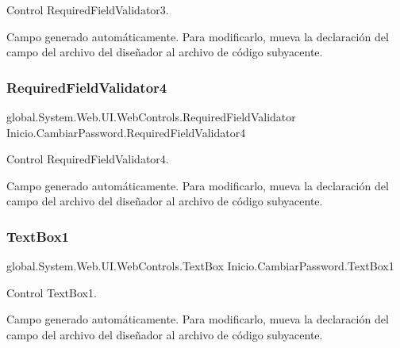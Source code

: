 Control Required\+Field\+Validator3. 

Campo generado automáticamente. Para modificarlo, mueva la declaración del campo del archivo del diseñador al archivo de código subyacente. \mbox{\label{classInicio_1_1CambiarPassword_a721210b960d80ff7c87c392dc8f4d78a}} 
\subsubsection{\texorpdfstring{RequiredFieldValidator4}{RequiredFieldValidator4}}
{\footnotesize\ttfamily global.\+System.\+Web.\+U\+I.\+Web\+Controls.\+Required\+Field\+Validator Inicio.\+Cambiar\+Password.\+Required\+Field\+Validator4\hspace{0.3cm}{\ttfamily [protected]}}



Control Required\+Field\+Validator4. 

Campo generado automáticamente. Para modificarlo, mueva la declaración del campo del archivo del diseñador al archivo de código subyacente. \mbox{\label{classInicio_1_1CambiarPassword_ab827a758058e29a7846579183e4cbcea}} 
\subsubsection{\texorpdfstring{TextBox1}{TextBox1}}
{\footnotesize\ttfamily global.\+System.\+Web.\+U\+I.\+Web\+Controls.\+Text\+Box Inicio.\+Cambiar\+Password.\+Text\+Box1\hspace{0.3cm}{\ttfamily [protected]}}



Control Text\+Box1. 

Campo generado automáticamente. Para modificarlo, mueva la declaración del campo del archivo del diseñador al archivo de código subyacente. \mbox{\label{classInicio_1_1CambiarPassword_a7eeeb21567b9f20fcb890fbffc4146f4}} 
